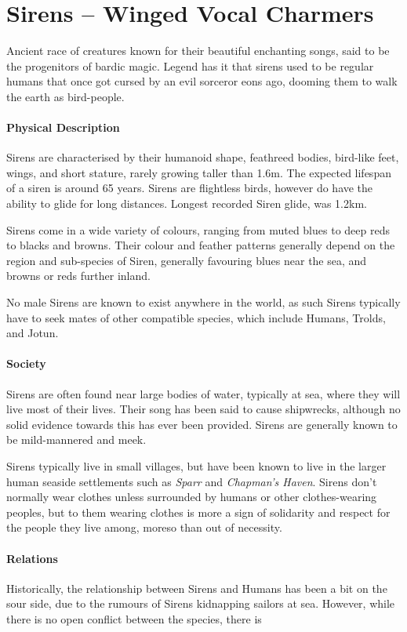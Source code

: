 \section{Sirens -- Winged Vocal Charmers}
Ancient race of creatures known for their beautiful enchanting songs, said to be the progenitors of bardic magic.
Legend has it that sirens used to be regular humans that once got cursed by an evil sorceror eons ago, dooming them to walk the earth as bird-people.

\paragraph{Physical Description}
Sirens are characterised by their humanoid shape, feathreed bodies, bird-like feet, wings, and short stature, rarely growing taller than 1.6m.
The expected lifespan of a siren is around 65 years.
Sirens are flightless birds, however do have the ability to glide for long distances.
Longest recorded Siren glide, was 1.2km.

Sirens come in a wide variety of colours, ranging from muted blues to deep reds to blacks and browns.
Their colour and feather patterns generally depend on the region and sub-species of Siren, generally favouring blues near the sea, and browns or reds further inland.

No male Sirens are known to exist anywhere in the world, as such Sirens typically have to seek mates of other compatible species, which include Humans, Trolds, and Jotun.

\paragraph{Society}
Sirens are often found near large bodies of water, typically at sea, where they will live most of their lives.
Their song has been said to cause shipwrecks, although no solid evidence towards this has ever been provided.
Sirens are generally known to be mild-mannered and meek.

Sirens typically live in small villages, but have been known to live in the larger human seaside settlements such as \textit{Sparr} and \textit{Chapman's Haven}.
Sirens don't normally wear clothes unless surrounded by humans or other clothes-wearing peoples, but to them wearing clothes is more a sign of solidarity and respect for the people they live among, moreso than out of necessity.

\paragraph{Relations}
Historically, the relationship between Sirens and Humans has been a bit on the sour side, due to the rumours of Sirens kidnapping sailors at sea.
However, while there is no open conflict between the species, there is 

